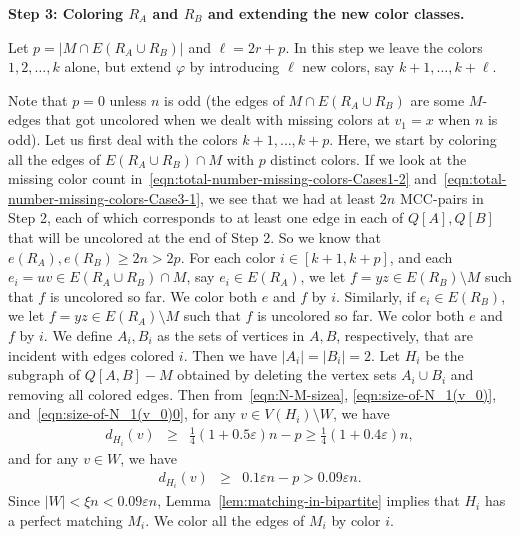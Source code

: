 \documentclass[11pt, oneside]{article}
\newcommand{\ve}{\varepsilon}
\begin{document}
\noindent \textbf{Step 3: Coloring $R_A$ and $R_B$ and extending the new color classes.}

Let  $p= |M\cap E(R_A \cup R_B)|$ and  $\ell= 2r+p$. 
In this step we leave the colors $1, 2, \ldots, k$ alone, but extend $\varphi$ by introducing $\ell$ new colors, say $k+1, \ldots, k+\ell$. 

Note that $p=0$ unless $n$ is odd (the edges of $M\cap E(R_A \cup R_B)$ are some   $M$-edges  that got uncolored when we dealt with missing colors at $v_1=x$ when $n$ is odd).  Let us first deal with the colors $k+1, \ldots, k+p$. Here, we start by coloring all the edges of $E(R_A \cup R_B) \cap M$ with $p$ distinct colors.  
If we look at the missing color count in~\eqref{eqn:total-number-missing-colors-Cases1-2} and~\eqref{eqn:total-number-missing-colors-Case3-1}, we see that we had at least $2n$ MCC-pairs in Step 2, each of which corresponds to at least one edge in each of $Q[A], Q[B]$ that will be uncolored at the end of Step 2. So we know that $e(R_A), e(R_B) \ge 2n > 2p$. For each color $i\in [k+1, k+p]$, 
and each $e_i=uv\in E(R_A \cup R_B)\cap M$, say $e_i \in E(R_A)$, we let $f=yz \in E(R_B)\setminus M$ such that $f$ is uncolored so far. 
We color both $e$ and $f$ by $i$.  
Similarly, if  $e_i \in E(R_B)$, we let $f=yz \in E(R_A)\setminus M$ such that $f$ is uncolored so far. 
We color both $e$ and $f$ by $i$.   
We define $A_i, B_i$ as the sets of vertices in $A, B$, respectively, that are incident with edges colored $i$. 
Then we have  $|A_i|=|B_i| =2$.  
Let $H_i$ be the subgraph of $Q[A, B]-M$ obtained by
deleting the vertex sets $A_i \cup B_i$ and removing all colored edges. 
Then from~\eqref{eqn:N-M-sizea}, \eqref{eqn:size-of-N_1(v_0)},  and~\eqref{eqn:size-of-N_1(v_0)0}, 
for any $v\in V(H_i)\setminus W$, we have 
\begin{eqnarray}
d_{H_i}(v)  &\ge& \tfrac{1}{4}(1+0.5\ve) n -p \ge \tfrac{1}{4}(1+0.4\ve) n,  \nonumber  
\end{eqnarray}
and for any  $v\in W$, we have 
\begin{eqnarray} 
d_{H_i}(v)  & \ge&   0.1\ve n -p >0.09\ve n.\nonumber 
\end{eqnarray}
Since $|W|< \xi n <0.09 \ve n$, Lemma~\ref{lem:matching-in-bipartite} implies that 
$H_i$ has a perfect matching $M_i$. We color all the edges of $M_i$
by color $i$. 
\end{document}
